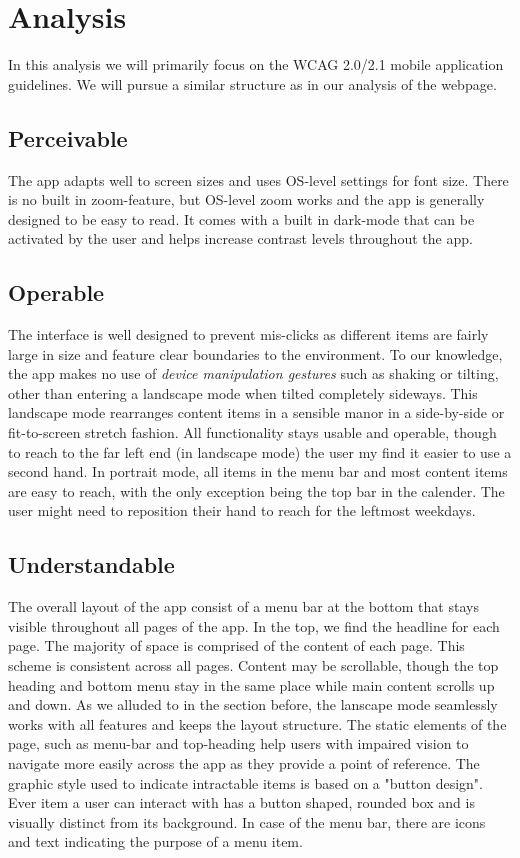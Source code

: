 \section{Analysis}
In this analysis we will primarily focus on the WCAG 2.0/2.1 mobile application guidelines. We will pursue a similar structure as in our analysis of the webpage.
\subsection*{Perceivable}
The app adapts well to screen sizes and uses OS-level settings for font size. There is no built in zoom-feature, but OS-level zoom works and the app is generally designed to be easy to read. It comes with a built in dark-mode that can be activated by the user and helps increase contrast levels throughout the app.

\subsection*{Operable}
The interface is well designed to prevent mis-clicks as different items are fairly large in size and feature clear boundaries to the environment. To our knowledge, the app makes no use of \textsl{device manipulation gestures} such as shaking or tilting, other than entering a landscape mode when tilted completely sideways. This landscape mode rearranges content items in a sensible manor in a side-by-side or fit-to-screen stretch fashion. All functionality stays usable and operable, though to reach to the far left end (in landscape mode) the user my find it easier to use a second hand.
In portrait mode, all items in the menu bar and most content items are easy to reach, with the only exception being the top bar in the calender. The user might need to reposition their hand to reach for the leftmost weekdays.

\subsection*{Understandable}
The overall layout of the app consist of a menu bar at the bottom that stays visible throughout all pages of the app. In the top, we find the headline for each page. The  majority of space is comprised of the content of each page. This scheme is consistent across all pages.
Content may be scrollable, though the top heading and bottom menu stay in the same place while main content scrolls up and down.
As we alluded to in the section before, the lanscape mode seamlessly works with all features and keeps the layout structure.
The static elements of the page, such as menu-bar and top-heading help users with impaired vision to navigate more easily across the app as they provide a point of reference.
The graphic style used to indicate intractable items is based on a "button design". Ever item a user can interact with has a button shaped, rounded box and is visually distinct from its background.
In case of the menu bar, there are icons and text indicating the purpose of a menu item.


